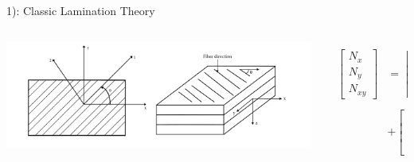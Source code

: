 \documentclass{beamer}
\begin{document}
\begin{frame}{1): Classic Lamination Theory}
    \begin{columns}[c]
    \begin{column}{0.5\textwidth}
		\includegraphics[width=1.5\linewidth]{./fig/lamina_local_global_axes.png}
    \end{column}
	\begin{column}{0.5\textwidth}
		\begin{equation} \label{eq:force_and_moments}
			\begin{array}{l}
				\begin{aligned}
			\begin{bmatrix}
				N_x \\
				N_y \\
				N_{xy}
			\end{bmatrix}
			&=
			\begin{bmatrix}
				A_{11} & A_{12} & A_{16} \\
				A_{12} & A_{22} & A_{26} \\
				A_{16} & A_{26} & A_{66} 
			\end{bmatrix}
			\begin{bmatrix}
				\varepsilon_x^0 \\
				\varepsilon_y^0 \\
				\gamma_{xy}^0
			\end{bmatrix}   \\
			&+               
			\begin{bmatrix}
				B_{11} & B_{12} & B_{16} \\
				B_{11} & B_{12} & B_{16} \\
				B_{16} & B_{26} & B_{66} 
			\end{bmatrix}
			\begin{bmatrix}
				k_x \\
				k_y \\
				k_{xy} 
			\end{bmatrix}  \\
		\end{aligned} \\ \\

\end{array}
\end{equation}
\end{column}
\end{columns}
\end{frame}
\end{document}
